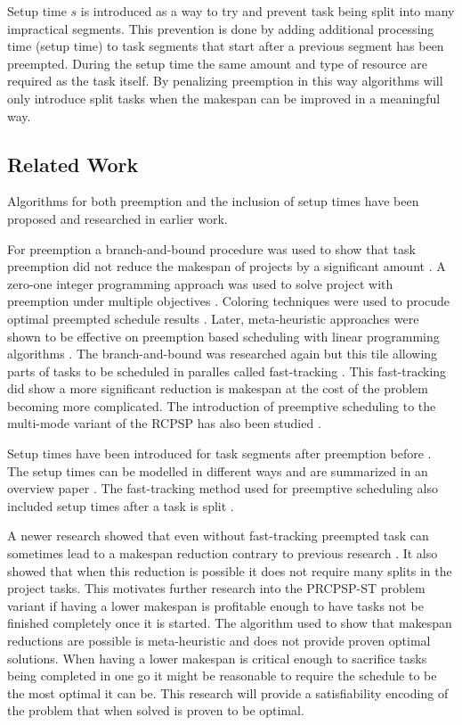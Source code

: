 Setup time \(s\) is introduced as a way to try and prevent task being split into many impractical segments. This prevention is done by adding additional processing time (setup time) to task segments that start after a previous segment has been preempted. During the setup time the same amount and type of resource are required as the task itself. By penalizing preemption in this way algorithms will only introduce split tasks when the makespan can be improved in a meaningful way.


\subsection{Related Work}
Algorithms for both preemption and the inclusion of setup times have been proposed and researched in earlier work.

For preemption a branch-and-bound procedure was used to show that task preemption did not reduce the makespan of projects by a significant amount \cite{RN21}. A zero-one integer programming approach was used to solve project with preemption under multiple objectives \cite{RN54}. Coloring techniques were used to procude optimal preempted schedule results \cite{RN55}. Later, meta-heuristic approaches were shown to be effective on preemption based scheduling with linear programming algorithms \cite{RN57,RN56}. The branch-and-bound was researched again but this tile allowing parts of tasks to be scheduled in paralles called fast-tracking \cite{RN7}. This fast-tracking did show a more significant reduction is makespan at the cost of the problem becoming more complicated. The introduction of preemptive scheduling to the multi-mode variant of the RCPSP has also been studied \cite{RN61,RN59,RN60}.

Setup times have been introduced for task segments after preemption before \cite{RN13}. The setup times can be modelled in different ways and are summarized in an overview paper \cite{RN62}. The fast-tracking method used for preemptive scheduling also included setup times after a task is split \cite{RN7}.

A newer research showed that even without fast-tracking preempted task can sometimes lead to a makespan reduction contrary to previous research \cite{RN1}. It also showed that when this reduction is possible it does not require many splits in the project tasks. This motivates further research into the PRCPSP-ST problem variant if having a lower makespan is profitable enough to have tasks not be finished completely once it is started. The algorithm used to show that makespan reductions are possible is meta-heuristic and does not provide proven optimal solutions. When having a lower makespan is critical enough to sacrifice tasks being completed in one go it might be reasonable to require the schedule to be the most optimal it can be. This research will provide a satisfiability encoding of the problem that when solved is proven to be optimal.